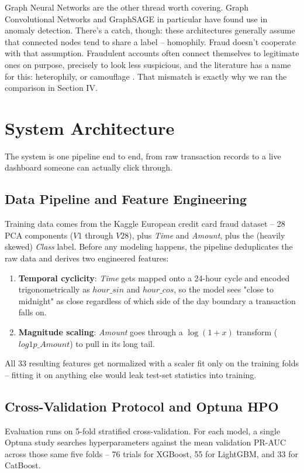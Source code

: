 \documentclass[conference]{IEEEtran}
\begin{document}
Graph Neural Networks are the other thread worth covering. Graph Convolutional Networks \cite{kipf2016semi} and GraphSAGE \cite{hamilton2017inductive} in particular have found use in anomaly detection. There's a catch, though: these architectures generally assume that connected nodes tend to share a label -- homophily. Fraud doesn't cooperate with that assumption. Fraudulent accounts often connect themselves to legitimate ones on purpose, precisely to look less suspicious, and the literature has a name for this: heterophily, or camouflage \cite{zhu2020beyond, dou2020enhancing, liu2021alleviating}. That mismatch is exactly why we ran the comparison in Section IV.

\section{System Architecture}
The system is one pipeline end to end, from raw transaction records to a live dashboard someone can actually click through.

\subsection{Data Pipeline and Feature Engineering}
Training data comes from the Kaggle European credit card fraud dataset -- 28 PCA components ($V1$ through $V28$), plus \textit{Time} and \textit{Amount}, plus the (heavily skewed) \textit{Class} label. Before any modeling happens, the pipeline deduplicates the raw data and derives two engineered features:
\begin{enumerate}
    \item \textbf{Temporal cyclicity}: \textit{Time} gets mapped onto a 24-hour cycle and encoded trigonometrically as $hour\_sin$ and $hour\_cos$, so the model sees "close to midnight" as close regardless of which side of the day boundary a transaction falls on.
    \item \textbf{Magnitude scaling}: \textit{Amount} goes through a $\log(1+x)$ transform ($log1p\_Amount$) to pull in its long tail.
\end{enumerate}
All 33 resulting features get normalized with a scaler \cite{pedregosa2011scikit} fit only on the training folds -- fitting it on anything else would leak test-set statistics into training.

\subsection{Cross-Validation Protocol and Optuna HPO}
Evaluation runs on 5-fold stratified cross-validation. For each model, a single Optuna \cite{akiba2019optuna} study searches hyperparameters against the mean validation PR-AUC across those same five folds -- 76 trials for XGBoost, 55 for LightGBM, and 33 for CatBoost.
\end{document}
